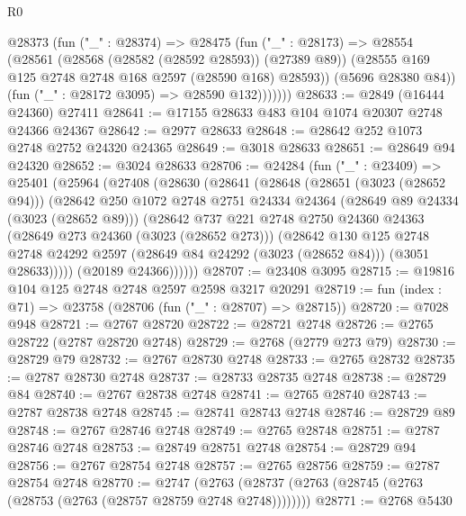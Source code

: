\begin{lexlean}{R0}
\begin{coremodule}
            @28373
              (fun ("_" : @28374) =>
              @28475
                (fun ("_" : @28173) =>
                @28554
                  (@28561
                    (@28568 (@28582 (@28592 @28593)) (@27389 @89))
                    (@28555 @169 @125 @2748 @2748 @168 @2597 (@28590 @168) @28593))
                  (@5696 @28380 @84))
                (fun ("_" : @28172 @3095) => @28590 @132)))))))
@28633 := @2849 (@16444 @24360) @27411
@28641 := @17155 @28633 @483 @104 @1074 @20307 @2748 @24366 @24367
@28642 := @2977 @28633
@28648 := @28642 @252 @1073 @2748 @2752 @24320 @24365
@28649 := @3018 @28633
@28651 := @28649 @94 @24320
@28652 := @3024 @28633
@28706 := @24284
    (fun ("_" : @23409) =>
    @25401
      (@25964
        (@27408
          (@28630
            (@28641
              (@28648
                (@28651 (@3023 (@28652 @94)))
                (@28642
                  @250
                  @1072
                  @2748
                  @2751
                  @24334
                  @24364
                  (@28649 @89 @24334 (@3023 (@28652 @89)))
                  (@28642
                    @737
                    @221
                    @2748
                    @2750
                    @24360
                    @24363
                    (@28649 @273 @24360 (@3023 (@28652 @273)))
                    (@28642
                      @130
                      @125
                      @2748
                      @2748
                      @24292
                      @2597
                      (@28649 @84 @24292 (@3023 (@28652 @84)))
                      (@3051 @28633)))))
              (@20189 @24366))))))
@28707 := @23408 @3095
@28715 := @19816 @104 @125 @2748 @2748 @2597 @2598 @3217 @20291
@28719 := fun (index : @71) => @23758 (@28706 (fun ("_" : @28707) => @28715))
@28720 := @7028 @948
@28721 := @2767 @28720
@28722 := @28721 @2748
@28726 := @2765 @28722 (@2787 @28720 @2748)
@28729 := @2768 (@2779 @273 @79)
@28730 := @28729 @79
@28732 := @2767 @28730 @2748
@28733 := @2765 @28732
@28735 := @2787 @28730 @2748
@28737 := @28733 @28735 @2748
@28738 := @28729 @84
@28740 := @2767 @28738 @2748
@28741 := @2765 @28740
@28743 := @2787 @28738 @2748
@28745 := @28741 @28743 @2748
@28746 := @28729 @89
@28748 := @2767 @28746 @2748
@28749 := @2765 @28748
@28751 := @2787 @28746 @2748
@28753 := @28749 @28751 @2748
@28754 := @28729 @94
@28756 := @2767 @28754 @2748
@28757 := @2765 @28756
@28759 := @2787 @28754 @2748
@28770 := @2747
    (@2763 (@28737 (@2763 (@28745 (@2763 (@28753 (@2763 (@28757 @28759 @2748 @2748))))))))
@28771 := @2768 @5430

\end{coremodule}
\end{lexlean}
